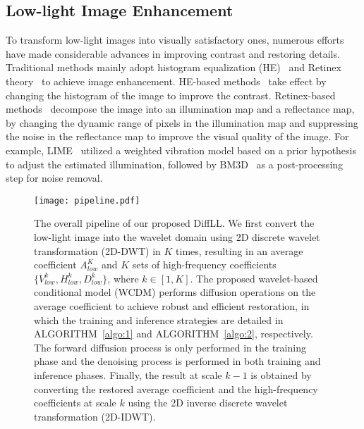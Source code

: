 \subsection{Low-light Image Enhancement}
To transform low-light images into visually satisfactory ones, numerous efforts have made considerable advances in improving contrast and restoring details. Traditional methods mainly adopt histogram equalization (HE)~\cite{HE} and Retinex theory~\cite{Retinex} to achieve image enhancement. HE-based methods~\cite{HE1,HE2,HE3} take effect by changing the histogram of the image to improve the contrast. Retinex-based methods~\cite{Retinex_based1,SRIE,Retinex_based2} decompose the image into an illumination map and a reflectance map, by changing the dynamic range of pixels in the illumination map and suppressing the noise in the reflectance map to improve the visual quality of the image. For example, LIME~\cite{LIME} utilized a weighted vibration model based on a prior hypothesis to adjust the estimated illumination, followed by BM3D~\cite{BM3D} as a post-processing step for noise removal.
\begin{figure*}[!t]
	\centering
	\texttt{[image: pipeline.pdf]}
	\caption{The overall pipeline of our proposed DiffLL. We first convert the low-light image into the wavelet domain using 2D discrete wavelet transformation (2D-DWT) in $K$ times, resulting in an average coefficient $A_{low}^{K}$ and $K$ sets of high-frequency coefficients $\{V_{low}^{k}, H_{low}^{k}, D_{low}^{k}\}$, where $k \in [1, K]$. The proposed wavelet-based conditional model (WCDM) performs diffusion operations on the average coefficient to achieve robust and efficient restoration, in which the training and inference strategies are detailed in ALGORITHM~\ref{algo:1} and ALGORITHM~\ref{algo:2}, respectively. The forward diffusion process is only performed in the training phase and the denoising process is performed in both training and inference phases. Finally, the result at scale $k-1$ is obtained by converting the restored average coefficient and the high-frequency coefficients at scale $k$ using the 2D inverse discrete wavelet transformation (2D-IDWT).}
	\label{fig:pipeline}
\end{figure*}

